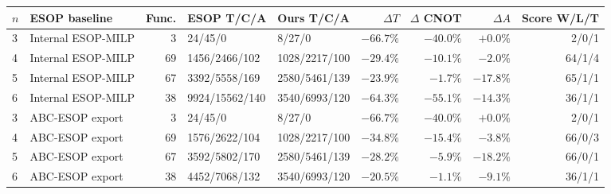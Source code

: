 \begin{tabular}{@{}llrllrrrr@{}}
\toprule
$n$ & ESOP baseline & Func. & ESOP T/C/A & Ours T/C/A & $\Delta T$ & $\Delta$ CNOT & $\Delta A$ & Score W/L/T \\
\midrule
3 & Internal ESOP\mbox{-}MILP & 3 & 24/45/0 & 8/27/0 & $-66.7\%$ & $-40.0\%$ & $+0.0\%$ & 2/0/1 \\
4 & Internal ESOP\mbox{-}MILP & 69 & 1456/2466/102 & 1028/2217/100 & $-29.4\%$ & $-10.1\%$ & $-2.0\%$ & 64/1/4 \\
5 & Internal ESOP\mbox{-}MILP & 67 & 3392/5558/169 & 2580/5461/139 & $-23.9\%$ & $-1.7\%$ & $-17.8\%$ & 65/1/1 \\
6 & Internal ESOP\mbox{-}MILP & 38 & 9924/15562/140 & 3540/6993/120 & $-64.3\%$ & $-55.1\%$ & $-14.3\%$ & 36/1/1 \\
3 & ABC\mbox{-}ESOP export & 3 & 24/45/0 & 8/27/0 & $-66.7\%$ & $-40.0\%$ & $+0.0\%$ & 2/0/1 \\
4 & ABC\mbox{-}ESOP export & 69 & 1576/2622/104 & 1028/2217/100 & $-34.8\%$ & $-15.4\%$ & $-3.8\%$ & 66/0/3 \\
5 & ABC\mbox{-}ESOP export & 67 & 3592/5802/170 & 2580/5461/139 & $-28.2\%$ & $-5.9\%$ & $-18.2\%$ & 66/0/1 \\
6 & ABC\mbox{-}ESOP export & 38 & 4452/7068/132 & 3540/6993/120 & $-20.5\%$ & $-1.1\%$ & $-9.1\%$ & 36/1/1 \\
\bottomrule
\end{tabular}
